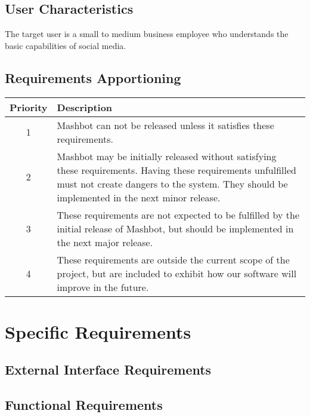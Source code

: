 \documentclass{article}
\begin{document}
	\subsection{User Characteristics} %
        The target user is a small to medium business employee who understands
        the basic capabilities of social media.
        
	\subsection{Requirements Apportioning} %
        \begin{tabular}{|c|p{4in}|}
          \hline
          \textbf{Priority} & \textbf{Description} \\
          \hline \hline
          1 & Mashbot can not be released unless it satisfies these
              requirements. \\
          \hline
          2 & Mashbot may be initially released without satisfying these
              requirements. Having these requirements unfulfilled must
              not create dangers to the system. They should be implemented in the next
              minor release. \\
          \hline
          3 & These requirements are not expected to be fulfilled by
              the initial release of Mashbot, but should be
              implemented in the next major release. \\
          \hline
          4 & These requirements are outside the current scope of the
              project, but are included to exhibit how our software
              will improve in the future. \\
          \hline
        \end{tabular}

\section{Specific Requirements}
	\subsection{External Interface Requirements}
	\subsection{Functional Requirements}
\end{document}
